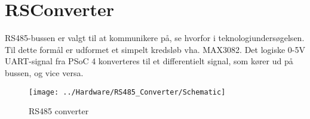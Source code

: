 \section{RSConverter}
RS485-bussen er valgt til at kommunikere på, se hvorfor i teknologiundersøgelsen. Til dette formål er udformet et simpelt kredsløb vha. MAX3082. Det logiske 0-5V UART-signal fra PSoC 4 konverteres til et differentielt signal, som kører ud på bussen, og vice versa.

\begin{figure}[H]
	\centering
	\texttt{[image: ../Hardware/RS485\_Converter/Schematic]}
	\caption{RS485 converter}
	\label{photo:RS485converter}
\end{figure}


